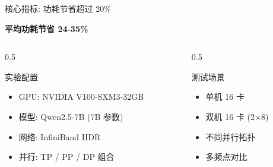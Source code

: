 \documentclass[aspectratio=169,10pt]{beamer}
\begin{document}
\begin{frame}{核心指标: 功耗节省超过 20\%}
\begin{center}
\huge \textbf{平均功耗节省 \textcolor{successgreen}{24-35\%}}
\end{center}
\vspace{0.5cm}
\begin{columns}
\begin{column}{0.5\textwidth}
\begin{block}{实验配置}
\begin{itemize}
    \item GPU: NVIDIA V100-SXM3-32GB
    \item 模型: Qwen2.5-7B (7B 参数)
    \item 网络: InfiniBand HDR
    \item 并行: TP / PP / DP 组合
\end{itemize}
\end{block}
\end{column}
\begin{column}{0.5\textwidth}
\begin{block}{测试场景}
\begin{itemize}
    \item 单机 16 卡
    \item 双机 16 卡 (2×8)
    \item 不同并行拓扑
    \item 多频点对比
\end{itemize}
\end{block}
\end{column}
\end{columns}
\end{frame}
\end{document}
